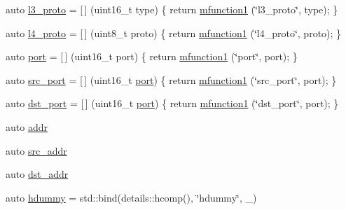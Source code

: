 \begin{DoxyCompactItemize}
\item 
auto \hyperlink{namespacepfq__lang_1_1anonymous__namespace_02default_8hpp_03_aed01dd5380a873d92397ec0d4c07abac}{l3\+\_\+proto} = \mbox{[}$\,$\mbox{]} (uint16\+\_\+t type) \{ return \hyperlink{namespacepfq__lang_a3cc9d61411c0398bb46aa2b33a21f7ed}{mfunction1} (\char`\"{}l3\+\_\+proto\char`\"{}, type); \}
\item 
auto \hyperlink{namespacepfq__lang_1_1anonymous__namespace_02default_8hpp_03_a75da77904f1cff4cc42fc3a081f80670}{l4\+\_\+proto} = \mbox{[}$\,$\mbox{]} (uint8\+\_\+t proto) \{ return \hyperlink{namespacepfq__lang_a3cc9d61411c0398bb46aa2b33a21f7ed}{mfunction1} (\char`\"{}l4\+\_\+proto\char`\"{}, proto); \}
\item 
auto \hyperlink{namespacepfq__lang_1_1anonymous__namespace_02default_8hpp_03_a1b370b44e5eedc364f3bb306d5042738}{port} = \mbox{[}$\,$\mbox{]} (uint16\+\_\+t port) \{ return \hyperlink{namespacepfq__lang_a3cc9d61411c0398bb46aa2b33a21f7ed}{mfunction1} (\char`\"{}port\char`\"{}, port); \}
\item 
auto \hyperlink{namespacepfq__lang_1_1anonymous__namespace_02default_8hpp_03_ad4d03d1e69ba9608a2d87ac91a2b521f}{src\+\_\+port} = \mbox{[}$\,$\mbox{]} (uint16\+\_\+t \hyperlink{namespacepfq__lang_1_1anonymous__namespace_02default_8hpp_03_a1b370b44e5eedc364f3bb306d5042738}{port}) \{ return \hyperlink{namespacepfq__lang_a3cc9d61411c0398bb46aa2b33a21f7ed}{mfunction1} (\char`\"{}src\+\_\+port\char`\"{}, port); \}
\item 
auto \hyperlink{namespacepfq__lang_1_1anonymous__namespace_02default_8hpp_03_aceccbe6ec912638fb8d5d3d9e0372a09}{dst\+\_\+port} = \mbox{[}$\,$\mbox{]} (uint16\+\_\+t \hyperlink{namespacepfq__lang_1_1anonymous__namespace_02default_8hpp_03_a1b370b44e5eedc364f3bb306d5042738}{port}) \{ return \hyperlink{namespacepfq__lang_a3cc9d61411c0398bb46aa2b33a21f7ed}{mfunction1} (\char`\"{}dst\+\_\+port\char`\"{}, port); \}
\item 
auto \hyperlink{namespacepfq__lang_1_1anonymous__namespace_02default_8hpp_03_aafce8334d1be83bff9a2115439c8c453}{addr}
\item 
auto \hyperlink{namespacepfq__lang_1_1anonymous__namespace_02default_8hpp_03_a63c87ff605d7cefa807fd61bc463785d}{src\+\_\+addr}
\item 
auto \hyperlink{namespacepfq__lang_1_1anonymous__namespace_02default_8hpp_03_a4b72bac7c3af312ffe7c670eb2583f9a}{dst\+\_\+addr}
\item 
auto \hyperlink{namespacepfq__lang_1_1anonymous__namespace_02default_8hpp_03_a4e7cf4874b42c5722f420fc54f360242}{hdummy} = std\+::bind(details\+::hcomp(), \char`\"{}hdummy\char`\"{}, \+\_)

\end{DoxyCompactItemize}
